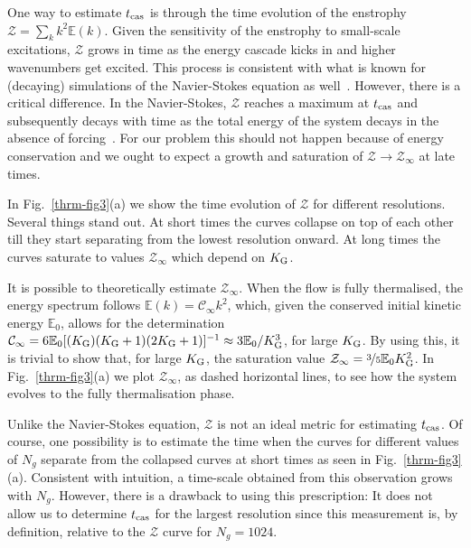 \documentclass[../Rajarshi-thesis-draft.tex]{subfiles}
\begin{document}
One way to estimate $t_{\rm cas}$ is through the time evolution of the enstrophy
$\mathcal{Z} = \sum_k k^2 \mathbb{E}(k)$. Given the sensitivity of the enstrophy to small-scale
excitations, $\mathcal{Z}$ grows in time as the energy cascade kicks in and higher
wavenumbers get excited. This process is consistent with what is known for
(decaying) simulations of the Navier-Stokes equation as well~\cite{Brachetetal1983}. However, there is
a critical difference. In the Navier-Stokes, $\mathcal{Z}$ reaches a maximum at
$t_{\rm cas}$ and subsequently decays with time as the total energy of the system
decays in the absence of
forcing~\cite{Brachetetal1983,HerringKerr1993,RayetalEPJB}. For our problem
this should not happen because of energy conservation and we ought to expect a
growth and saturation of $\mathcal{Z} \to \mathcal{Z}_\infty$ at late times.

In Fig.~\ref{thrm-fig3}(a) we show the time evolution of $\mathcal{Z}$ for
different resolutions.  Several things stand out. At short times the
curves collapse on top of each other till they start separating from the lowest
resolution onward. At long times the curves saturate to values
$\mathcal{Z}_{\infty}$ which depend on $K_{\rm G}$.

It is possible to theoretically estimate $\mathcal{Z}_{\infty}$. When the
flow is fully thermalised, the energy spectrum follows $\mathbb{E}(k) = \mathcal{C}_\infty k^2$, which, given the
conserved initial kinetic energy $\mathbb{E}_0$, allows for the determination
$\mathcal{C}_\infty = 6\mathbb{E}_0 [(K_{\rm G})(K_{\rm G}+1)(2K_{\rm G} + 1)]^{-1} \approx 3\mathbb{E}_0/K_{\rm G}^3$, for large $K_{\rm G}$.
By using this, it is trivial to show that, for large $K_{\rm G}$,  the
saturation value $\mathcal{Z}_{\infty} =  \nicefrac{3}{5}\mathbb{E}_0 K_{\rm G}^2$. In Fig.~\ref{thrm-fig3}(a) we plot
$\mathcal{Z}_{\infty}$, as dashed horizontal lines, to see how the system evolves to
the fully thermalisation phase.

Unlike the Navier-Stokes equation, $\mathcal{Z}$ is not an ideal
metric for estimating $t_{\rm cas}$. Of course, one possibility is to estimate the time when
the curves for different values of $N_g$ separate from the collapsed curves at short times as
seen in Fig.~\ref{thrm-fig3}(a). Consistent with intuition, a time-scale obtained from this observation
grows with $N_g$. However, there is a drawback to using this prescription: It does not allow us to determine
$t_{\rm cas}$ for the largest resolution since this measurement is, by definition, relative to the $\mathcal{Z}$ curve
for $N_g = 1024$.
\end{document}
